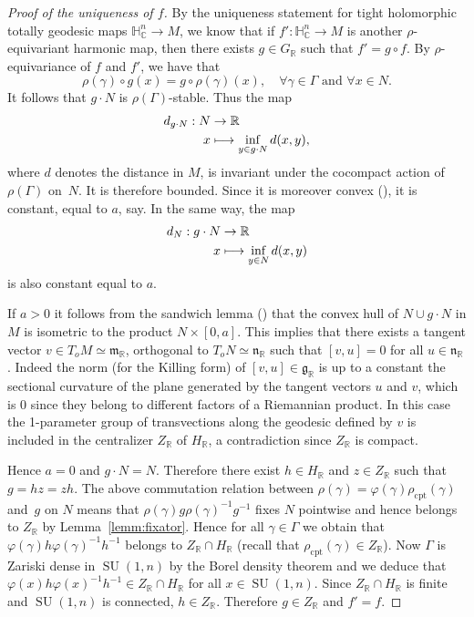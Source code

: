 \documentclass[10pt]{amsart}
\newcommand{\mto}{\mathchoice{\longmapsto}{\mapsto}{\mapsto}{\mapsto}}
\newcommand{\citestar}[3]{\cite[#3]{#1}}
\theoremstyle{plain}
\theoremstyle{definition}
\DeclareMathOperator{\SU}{SU}
\newcommand{\bR}{\mathbb{R}}
\newcommand{\HC}{{\mathbb{H}^n_\mathbb{C}}}
\newcommand{\fgg}{\mathfrak{g}}
\newcommand{\fm}{\mathfrak{m}}
\newcommand{\fn}{\mathfrak{n}}
\newcommand{\rhoc}{\rho_\mathrm{cpt}}
\begin{document}
\begin{proof}[Proof of the uniqueness of $f$]
By the uniqueness statement for tight holomorphic
\hbox{totally} geodesic maps $\HC\to M$, we know that if $f':\HC\to M$ is
another $\rho$-equivariant harmonic map, then there exists $g\in G_\bR$ such that $f'=g\circ f$. By
$\rho$-equivariance of $f$ and $f'$, we have that
$$
\rho(\gamma)\circ g(x)=g\circ\rho(\gamma)(x),\quad\forall \gamma\in\Gamma\mbox{ and }\forall x\in N.
$$
It follows that $g \cdot N$ is $\rho(\Gamma)$-stable.
Thus the map
\begin{align*}
d_{g\cdot N}:N&\to\bR\\ x&\mto \inf_{y \in g \cdot N} d(x,y),
\end{align*}
where
$d$ denotes the distance in
$M$, is invariant under the cocompact action of $\rho(\Gamma)$ on~$N$. It is therefore
bounded. Since it is moreover convex (\citestar{BH}*{p.\,178}), it is constant, equal to $a$, say. In the same way, the map
\begin{align*}
d_N:g\cdot N&\to\bR\\
x&\mto \inf_{y \in N} d(x,y)
\end{align*}
is also constant equal to $a$.

If $a>0$ it follows from the sandwich
lemma (\citestar{BH}*{p.\,182}) that the convex hull of $N\cup g\cdot N$ in $M$ is isometric to the product $N\times
[0,a]$. This implies that there exists a tangent vector $v\in T_oM\simeq \fm_\bR$, orthogonal to
$T_oN\simeq \fn_\bR$ such that $[v,u]=0$ for all $u\in\fn_\bR$. Indeed the
norm (for the Killing form) of $[v,u]\in \fgg_\bR$ is up to a constant the sectional curvature of the
plane generated by the tangent vectors $u$ and $ v$, which is $0$ since they belong to different factors
of a Riemannian product.
In this case the 1-parameter group of transvections along
the geodesic defined by $v$ is included in the centralizer $Z_\bR$ of $H_\bR$, a contradiction since
$Z_\bR$ is compact.

Hence $a=0$ and $g\cdot N=N$. Therefore there exist $h\in H_\bR$ and $z\in Z_\bR$ such
that $g=hz=zh$. The above commutation relation between $\rho(\gamma)=\varphi(\gamma)\rhoc(\gamma)$ and~$g$ on $N$
means that $\rho(\gamma)g\rho(\gamma)^{-1}g^{-1}$ fixes $N$ pointwise and hence belongs to $Z_\bR$ by
Lemma~\ref{lemm:fixator}. Hence for
all $\gamma\in\Gamma$ we obtain that $\varphi(\gamma)h\varphi(\gamma)^{-1}h^{-1}$ belongs to $Z_\bR\cap H_\bR$
(recall that $\rhoc(\gamma) \in Z_\bR$). Now $\Gamma$
is Zariski dense in $\SU(1,n)$ by the Borel density theorem and we deduce that
$\varphi(x)h\varphi(x)^{-1}h^{-1}\in Z_\bR\cap H_\bR$ for all $x\in\SU(1,n)$.
Since $Z_\bR\cap H_\bR$ is finite and
$\SU(1,n)$ is connected, $h\in Z_\bR$. Therefore $g\in Z_\bR$ and $f'=f$.
\end{proof}
\end{document}
